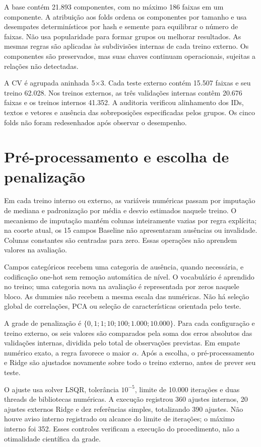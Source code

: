 A base contém 21.893 componentes, com no máximo 186 faixas em um componente. A atribuição aos folds ordena os componentes por tamanho e usa desempates determinísticos por hash e semente para equilibrar o número de faixas. Não usa popularidade para formar grupos ou melhorar resultados. As mesmas regras são aplicadas às subdivisões internas de cada treino externo. Os componentes são preservados, mas suas chaves continuam operacionais, sujeitas a relações não detectadas.

A CV é agrupada aninhada 5$\times$3. Cada teste externo contém 15.507 faixas e seu treino 62.028. Nos treinos externos, as três validações internas contêm 20.676 faixas e os treinos internos 41.352. A auditoria verificou alinhamento dos IDs, textos e vetores e ausência das sobreposições especificadas pelos grupos. Os cinco folds não foram redesenhados após observar o desempenho.

\section{Pré-processamento e escolha de penalização}
Em cada treino interno ou externo, as variáveis numéricas passam por imputação de mediana e padronização por média e desvio estimados naquele treino. O mecanismo de imputação mantém colunas inteiramente vazias por regra explícita; na coorte atual, os 15 campos Baseline não apresentaram ausências ou invalidade. Colunas constantes são centradas para zero. Essas operações não aprendem valores na avaliação.

Campos categóricos recebem uma categoria de ausência, quando necessária, e codificação one-hot sem remoção automática de nível. O vocabulário é aprendido no treino; uma categoria nova na avaliação é representada por zeros naquele bloco. As dummies não recebem a mesma escala das numéricas. Não há seleção global de correlações, PCA ou seleção de características orientada pelo teste.

A grade de penalização é $\{0{,}1;1;10;100;1.000;10.000\}$. Para cada configuração e treino externo, os seis valores são comparados pela soma dos erros absolutos das validações internas, dividida pelo total de observações previstas. Em empate numérico exato, a regra favorece o maior $\alpha$. Após a escolha, o pré-processamento e Ridge são ajustados novamente sobre todo o treino externo, antes de prever seu teste.

O ajuste usa solver LSQR, tolerância $10^{-5}$, limite de 10.000 iterações e duas threads de bibliotecas numéricas. A execução registrou 360 ajustes internos, 20 ajustes externos Ridge e dez referências simples, totalizando 390 ajustes. Não houve aviso interno registrado ou alcance do limite de iterações; o máximo interno foi 352. Esses controles verificam a execução do procedimento, não a otimalidade científica da grade.


